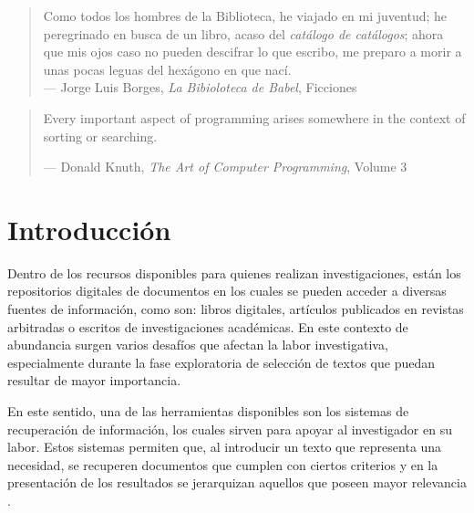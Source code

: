 \documentclass[
  12pt,
  openany]{book}
\begin{document}
\newpage
\thispagestyle{empty}
\vspace*{5cm}
\hfill
\begin{minipage}{0.70\textwidth}
\begin{quote}
Como todos los hombres de la Biblioteca, he viajado en mi juventud; he peregrinado en busca de un libro, acaso del \emph{catálogo de catálogos}; ahora que mis ojos caso no pueden descifrar lo que escribo, me preparo a morir a unas pocas leguas del hexágono en que nací.\\
--- Jorge Luis Borges, \textit{La Bibioloteca de Babel}, Ficciones
\end{quote}
\hspace*{2cm}

\begin{quote}
Every important aspect of programming arises somewhere in the context of sorting or searching.

--- Donald Knuth, \textit{The Art of Computer Programming}, Volume 3
\end{quote}
\end{minipage}

\thispagestyle{empty}
\maketitle



{
\setcounter{tocdepth}{4}
\tableofcontents
}
\listoffigures
\listoftables
\clearpage
{}

\hypertarget{introduccion}{%
\chapter{Introducción}\label{introduccion}}

Dentro de los recursos disponibles para quienes realizan investigaciones, están los repositorios digitales de documentos en los cuales se pueden acceder a diversas fuentes de información, como son: libros digitales, artículos publicados en revistas arbitradas o escritos de investigaciones académicas. En este contexto de abundancia surgen varios desafíos que afectan la labor investigativa, especialmente durante la fase exploratoria de selección de textos que puedan resultar de mayor importancia.

En este sentido, una de las herramientas disponibles son los sistemas de recuperación de información, los cuales sirven para apoyar al investigador en su labor. Estos sistemas permiten que, al introducir un texto que representa una necesidad, se recuperen documentos que cumplen con ciertos criterios y en la presentación de los resultados se jerarquizan aquellos que poseen mayor relevancia \citep{manning2008}.
\end{document}

